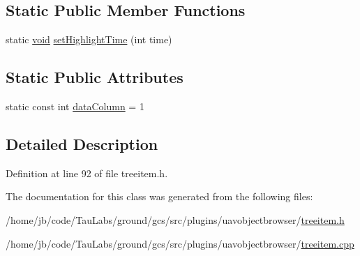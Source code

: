 \subsection*{\-Static \-Public \-Member \-Functions}
\begin{DoxyCompactItemize}
\item 
static \hyperlink{group___u_a_v_objects_plugin_ga444cf2ff3f0ecbe028adce838d373f5c}{void} \hyperlink{group___u_a_v_object_browser_plugin_ga75de400d0bd7ba687fcc1535a3a0f871}{set\-Highlight\-Time} (int time)
\end{DoxyCompactItemize}
\subsection*{\-Static \-Public \-Attributes}
\begin{DoxyCompactItemize}
\item 
static const int \hyperlink{group___u_a_v_object_browser_plugin_gad4ee9a1203f812d975a410765ddb8710}{data\-Column} = 1
\end{DoxyCompactItemize}


\subsection{\-Detailed \-Description}


\-Definition at line 92 of file treeitem.\-h.



\-The documentation for this class was generated from the following files\-:\begin{DoxyCompactItemize}
\item 
/home/jb/code/\-Tau\-Labs/ground/gcs/src/plugins/uavobjectbrowser/\hyperlink{treeitem_8h}{treeitem.\-h}\item 
/home/jb/code/\-Tau\-Labs/ground/gcs/src/plugins/uavobjectbrowser/\hyperlink{treeitem_8cpp}{treeitem.\-cpp}\end{DoxyCompactItemize}
